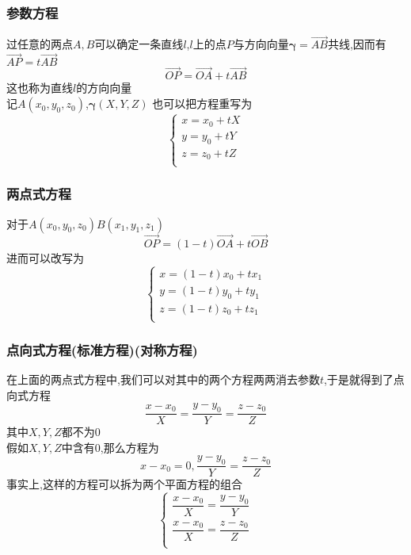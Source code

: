 \documentclass{article}
\newcommand{\ve}{\boldsymbol}
\begin{document}
\begin{CJK}{UTF8}{gkai}
\subsubsection*{参数方程}
过任意的两点$A,B$可以确定一条直线$l$,$l$上的点$P$与方向向量$\ve{\gamma}=\overrightarrow{AB}$共线,因而有$\overrightarrow{AP}=t\overrightarrow{AB}$
\[\overrightarrow{OP}=\overrightarrow{OA}+t\overrightarrow{AB}\]
这也称为直线$l$的方向向量\\
记$A(x_0,y_0,z_0)$,$\ve{\gamma}(X,Y,Z)$
也可以把方程重写为
\begin{equation*}
    \begin{cases}
    x=x_0+tX\\
    y=y_0+tY\\
    z=z_0+tZ\\
    \end{cases}
\end{equation*}
\subsubsection*{两点式方程}
对于$A(x_0,y_0,z_0)B(x_1,y_1,z_1)$
\[\overrightarrow{OP}=(1-t)\overrightarrow{OA}+t\overrightarrow{OB}\]
进而可以改写为
\begin{equation*}
    \begin{cases}
        x=(1-t)x_0+tx_1\\
        y=(1-t)y_0+ty_1\\
        z=(1-t)z_0+tz_1\\
    \end{cases}
\end{equation*}

\subsubsection*{点向式方程(标准方程)(对称方程)}
在上面的两点式方程中,我们可以对其中的两个方程两两消去参数$t$,于是就得到了点向式方程
\[\dfrac{x-x_0}{X}=\dfrac{y-y_0}{Y}=\dfrac{z-z_0}{Z}\]
其中$X,Y,Z$都不为0\\
假如$X,Y,Z$中含有0,那么方程为\\
\[x-x_0=0,\dfrac{y-y_0}{Y}=\dfrac{z-z_0}{Z}\]
事实上,这样的方程可以拆为两个平面方程的组合\\
\begin{equation*}
    \begin{cases}
\dfrac{x-x_0}{X}=\dfrac{y-y_0}{Y}\\
\dfrac{x-x_0}{X}=\dfrac{z-z_0}{Z}\\
    \end{cases}
\end{equation*}

\end{CJK}
\end{document}
